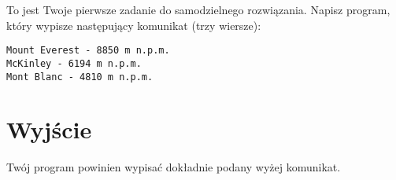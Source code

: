 \documentclass{spiral-kurs}
\begin{document}
\makeheader
%
    To jest Twoje pierwsze zadanie do samodzielnego rozwiązania.
    Napisz program, który wypisze następujący komunikat
    (trzy wiersze):

\begin{verbatim}
Mount Everest - 8850 m n.p.m.
McKinley - 6194 m n.p.m.
Mont Blanc - 4810 m n.p.m.
\end{verbatim}

    \section{Wyjście}
    Twój program powinien wypisać dokładnie podany wyżej komunikat.


  
\end{document}
